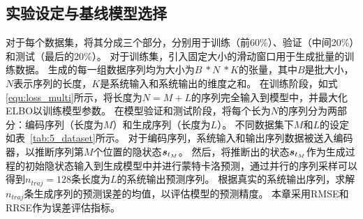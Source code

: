 \subsection{实验设定与基线模型选择}
对于每个数据集，将其分成三个部分，分别用于训练（前60\%）、验证（中间20\%）和测试（最后的20\%）。
对于训练集，引入固定大小的滑动窗口用于生成批量的训练数据。
生成的每一组数据序列均为大小为$B \ * N\ * K$的张量，其中$B$是批大小，$N$表示序列的长度，$K$是系统输入和系统输出的维度之和。
在训练阶段，如式\eqref{equ:loss_multi}所示，将长度为$N=M+L$的序列完全输入到模型中，并最大化ELBO以训练模型参数。
在模型验证和测试阶段，将每个长为$N$的序列分为两部分：编码序列（长度为$M$）和生成序列（长度为$L$）。
不同数据集下$M$和$L$的设定如表~\ref{tab:5_dataset}所示。
对于编码序列，系统输入和输出序列数据被送入编码器，以推断序列第$M$个位置的隐状态$\boldsymbol s_{t_M}$。
然后，将推断出的状态$\boldsymbol s_{t_M}$作为生成过程的初始隐状态输入到生成模型中并进行蒙特卡洛预测，通过并行的序列采样可以得到$n_{traj}=128$条长度为$L$的系统输出预测序列。
根据真实的系统输出序列，求解$n_{traj}$条生成序列的预测误差的均值，以评估模型的预测精度。
本章采用RMSE和RRSE作为误差评估指标。

